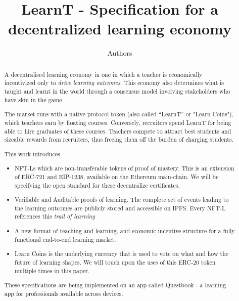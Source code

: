\documentclass{article}
\author{Authors}
\title{LearnT - Specification for a decentralized learning economy}
\begin{document}
  \maketitle
  \begin{abstract}
    A decentralised learning economy in one in which a teacher is economically incentivized only to \textit{drive learning outcomes}.
    This economy also determines what is taught and learnt in the world through a consensus model involving stakeholders who have skin in the game.
    \par
    The market runs  with a native protocol token (also called “LearnT” or "Learn Coins"), which teachers earn by floating courses. 
    Conversely, recruiters spend LearnT for being able to hire graduates of these courses. 
    Teachers compete to attract best students and sizeable rewards from recruiters, thus freeing them off the burden of charging students. 
    \par
    This work introduces
    \begin{itemize}
      \item NFT-Ls which are non-transferable tokens of proof of mastery. 
        This is an extension of ERC-721 and EIP-1238, available on the Ethereum main-chain. 
        We will be specifying the open standard for these decentralize certificates.
      \item Verifiable and Auditable proofs of learning. 
        The complete set of events leading to the learning outcomes are publicly stored and accessible on IPFS.
        Every NFT-L references this \textit{trail of learning}
      \item A new format of teaching and learning, and economic incentive structure for a fully functional end-to-end learning market.
      \item Learn Coins is the underlying currency that is used to vote on what and how the future of learning shapes. 
        We will touch upon the uses of this ERC-20 token multiple times in this paper.
    \end{itemize}
    \par
    These specifications are being implemented on an app called Questbook - a learning app for professionals available across devices.

  \end{abstract}
\end{document}
